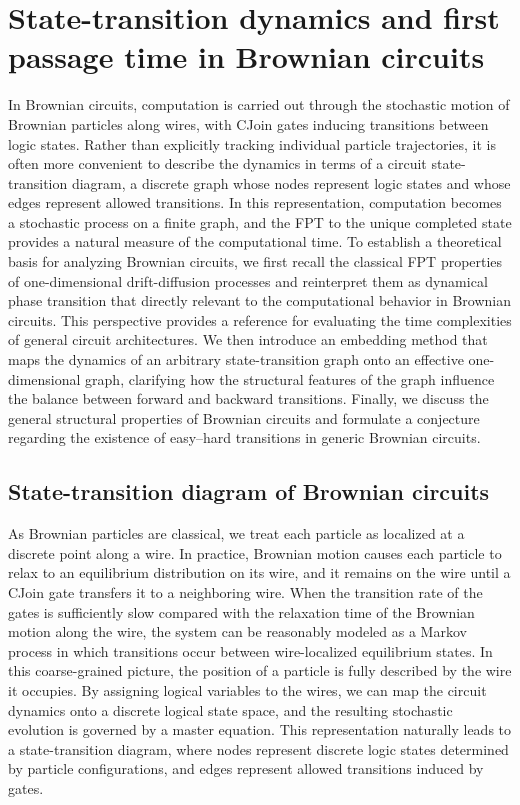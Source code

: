 \documentclass[%
 reprint,
superscriptaddress,
 amsmath,amssymb,
 aps,
 prx,
]{revtex4-2}
\begin{document}
\section{State-transition dynamics and first passage time in Brownian circuits}\label{Brownian Motion and First Passage Time}
In Brownian circuits, computation is carried out through the stochastic motion of Brownian particles along wires, with CJoin gates inducing transitions between logic states. Rather than explicitly tracking individual particle trajectories, it is often more convenient to describe the dynamics in terms of a circuit state-transition diagram, a discrete graph whose nodes represent logic states and whose edges represent allowed transitions. In this representation, computation becomes a stochastic process on a finite graph, and the FPT to the unique completed state provides a natural measure of the computational time. To establish a theoretical basis for analyzing Brownian circuits, we first recall the classical FPT properties of one-dimensional drift-diffusion processes and reinterpret them as dynamical phase transition that directly relevant to the computational behavior in Brownian circuits. This perspective provides a reference for evaluating the time complexities of general circuit architectures. We then introduce an embedding method that maps the dynamics of an arbitrary state-transition graph onto an effective one-dimensional graph, clarifying how the structural features of the graph influence the balance between forward and backward transitions. Finally, we discuss the general structural properties of Brownian circuits and formulate a conjecture regarding the existence of easy--hard transitions in generic Brownian circuits. 

\subsection{State-transition diagram of Brownian circuits}\label{State diagram of circuit}
As Brownian particles are classical, we treat each particle as localized at a discrete point along a wire. 
In practice, Brownian motion causes each particle to relax to an equilibrium distribution on its wire, and it remains on the wire until a CJoin gate transfers it to a neighboring wire. When the transition rate of the gates is sufficiently slow compared with the relaxation time of the Brownian motion along the wire, the system can be reasonably modeled as a Markov process in which transitions occur between wire-localized equilibrium states. In this coarse-grained picture, the position of a particle is fully described by the wire it occupies. By assigning logical variables to the wires, we can map the circuit dynamics onto a discrete logical state space, and the resulting stochastic evolution is governed by a master equation. This representation naturally leads to a state-transition diagram, where nodes represent discrete logic states determined by particle configurations, and edges represent allowed transitions induced by gates.  
\end{document}
